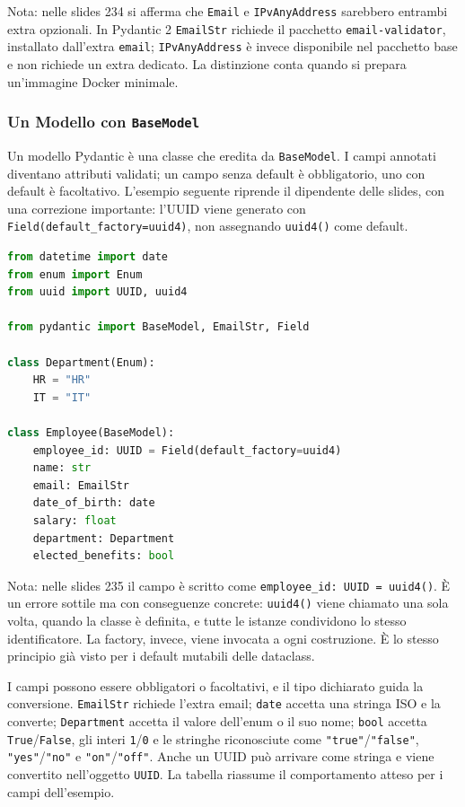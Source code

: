 \documentclass[12pt]{extarticle}
\begin{document}
\noindent Nota: nelle slides 234 si afferma che \texttt{Email} e \texttt{IPvAnyAddress} sarebbero entrambi extra opzionali. In Pydantic 2 \texttt{EmailStr} richiede il pacchetto \texttt{email-validator}, installato dall'extra \texttt{email}; \texttt{IPvAnyAddress} è invece disponibile nel pacchetto base e non richiede un extra dedicato. La distinzione conta quando si prepara un'immagine Docker minimale.

\subsubsection{Un Modello con \texttt{BaseModel}}

\noindent Un modello Pydantic è una classe che eredita da \texttt{BaseModel}. I campi annotati diventano attributi validati; un campo senza default è obbligatorio, uno con default è facoltativo. L'esempio seguente riprende il dipendente delle slides, con una correzione importante: l'UUID viene generato con \texttt{Field(default\_factory=uuid4)}, non assegnando \texttt{uuid4()} come default.

\begin{lstlisting}[language=Python]
from datetime import date
from enum import Enum
from uuid import UUID, uuid4

from pydantic import BaseModel, EmailStr, Field

class Department(Enum):
    HR = "HR"
    IT = "IT"

class Employee(BaseModel):
    employee_id: UUID = Field(default_factory=uuid4)
    name: str
    email: EmailStr
    date_of_birth: date
    salary: float
    department: Department
    elected_benefits: bool
\end{lstlisting}

\noindent Nota: nelle slides 235 il campo è scritto come \texttt{employee\_id: UUID = uuid4()}. È un errore sottile ma con conseguenze concrete: \texttt{uuid4()} viene chiamato una sola volta, quando la classe è definita, e tutte le istanze condividono lo stesso identificatore. La factory, invece, viene invocata a ogni costruzione. È lo stesso principio già visto per i default mutabili delle dataclass.

\noindent I campi possono essere obbligatori o facoltativi, e il tipo dichiarato guida la conversione. \texttt{EmailStr} richiede l'extra email; \texttt{date} accetta una stringa ISO e la converte; \texttt{Department} accetta il valore dell'enum o il suo nome; \texttt{bool} accetta \texttt{True}/\texttt{False}, gli interi \texttt{1}/\texttt{0} e le stringhe riconosciute come \texttt{"true"}/\texttt{"false"}, \texttt{"yes"}/\texttt{"no"} e \texttt{"on"}/\texttt{"off"}. Anche un UUID può arrivare come stringa e viene convertito nell'oggetto \texttt{UUID}. La tabella riassume il comportamento atteso per i campi dell'esempio.
\end{document}
